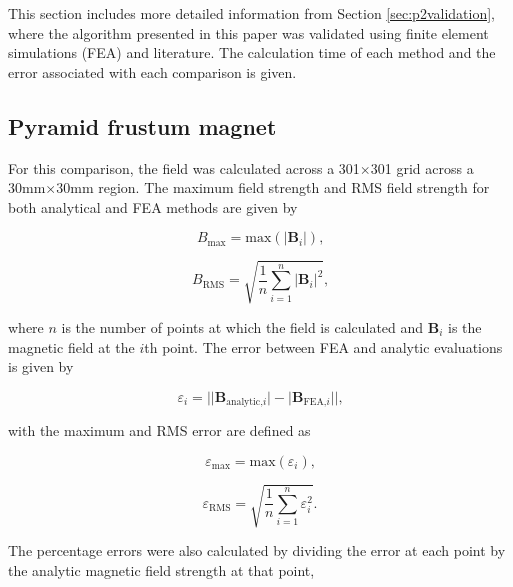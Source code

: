 This section includes more detailed information from Section \ref{sec:p2validation}, where the algorithm presented in this paper was validated using finite element simulations (FEA) and literature. The calculation time of each method and the error associated with each comparison is given.

\subsection*{Pyramid frustum magnet}

For this comparison, the field was calculated across a 301\(\times\)301 grid across a 30mm\(\times\)30mm region. The maximum field strength and RMS field strength for both analytical and FEA methods are given by

\begin{equation}\label{eqn:p2bmax}
	B_{\text{max}} = \text{max}\left(\left|\mathbf{B}_i\right|\right) \text{,}
\end{equation}

\begin{equation}\label{eqn:p2brms}
	B_{\text{RMS}} = \sqrt{\frac{1}{n} \sum_{i=1}^{n} \left| \mathbf{B}_i \right| ^2} \text{,}
\end{equation}

\noindent where \(n\) is the number of points at which the field is calculated and \(\mathbf{B}_i\) is the magnetic field at the \(i\)th point. The error between FEA and analytic evaluations is given by

\begin{equation}
\varepsilon_i = \Big|\big|\mathbf{B}_{\text{analytic,}i}\big|-\big|\mathbf{B}_{\text{FEA,}i}\big|\Big| \text{,}
\end{equation}

\noindent with the maximum and RMS error are defined as

\begin{equation}\label{eqn:p2errmax}
	\varepsilon_{\text{max}} = \text{max}\left(\varepsilon_i\right) \text{,}
\end{equation}

\begin{equation}\label{eqn:p2errrms}
	\varepsilon_{\text{RMS}} = \sqrt{\frac{1}{n} \sum_{i = 1}^n \varepsilon_i^2} \text{.}
\end{equation}

\noindent The percentage errors were also calculated by dividing the error at each point by the analytic magnetic field strength at that point,

